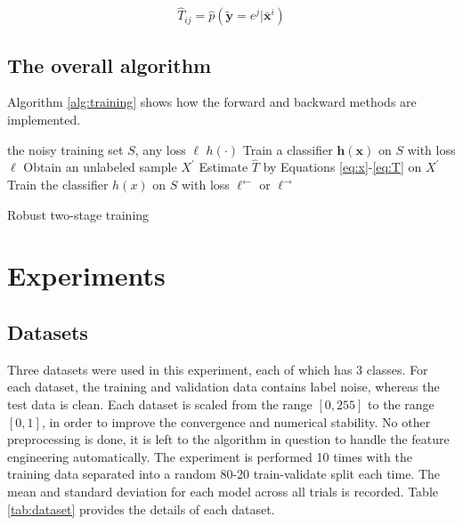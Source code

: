 \documentclass{article} %
\begin{document}
\begin{equation}
\hat{T}_{ij} = \hat{p}\left(\tilde{\boldsymbol{y}}=e^j|\bar{\boldsymbol{x}}^i\right)
\label{eq:T}
\end{equation}

\subsection{The overall algorithm}
Algorithm \ref{alg:training} shows how the forward and backward methods are implemented.

\begin{algorithm}
\begin{algorithmic}
\REQUIRE the noisy training set $S$, any loss $\ell$
\ENSURE $h\left(\cdot\right)$
  \STATE Train a classifier $\boldsymbol{h}\left(\boldsymbol{x}\right)$ on $S$ with loss $\ell$
  \STATE Obtain an unlabeled sample $X^\prime$
  \STATE Estimate $\hat{T}$ by Equations \eqref{eq:x}-\eqref{eq:T} on $X^\prime$
\ENDIF
\STATE Train the classifier $h\left(x\right)$ on $S$ with loss $\ell^\leftarrow$ or $\ell^\rightarrow$
\end{algorithmic}
\caption{Robust two-stage training \label{alg:training}}
\end{algorithm}

\section{Experiments}
\subsection{Datasets}
Three datasets were used in this experiment, each of which has 3 classes. For each dataset, the training and validation data contains label noise, whereas the test data is clean. Each dataset is scaled from the range $\left[0,255\right]$ to the range $\left[0,1\right]$, in order to improve the convergence and numerical stability. No other preprocessing is done, it is left to the algorithm in question to handle the feature engineering automatically. The experiment is performed 10 times with the training data separated into a random 80-20 train-validate split each time. The mean and standard deviation for each model across all trials is recorded. Table \ref{tab:dataset} provides the details of each dataset.
\end{document}

